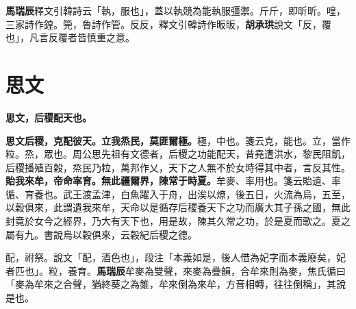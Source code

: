 \begin{quoting}\textbf{馬瑞辰}釋文引韓詩云「執，服也」，蓋以執競為能執服彊禦。斤斤，即昕昕。喤，三家詩作鍠。筦，魯詩作管。反反，釋文引韓詩作昄昄，\textbf{胡承珙}說文「反，覆也」，凡言反覆者皆慎重之意。\end{quoting}

\section{思文}


\textbf{思文，后稷配天也。}

\textbf{思文后稷，克配彼天。立我烝民，莫匪爾極。}{\footnotesize 極，中也。箋云克，能也。立，當作粒。烝，眾也。周公思先祖有文德者，后稷之功能配天，昔堯遭洪水，黎民阻飢，后稷播殖百穀，烝民乃粒，萬邦作乂，天下之人無不於女時得其中者，言反其性。}\textbf{貽我來牟，帝命率育。無此疆爾界，陳常于時夏。}{\footnotesize 牟麥、率用也。箋云貽遺、率循、育養也。武王渡孟津，白魚躍入于舟，出涘以燎，後五日，火流為烏，五至，以穀俱來，此謂遺我來牟，天命以是循存后稷養天下之功而廣大其子孫之國，無此封竟於女今之經界，乃大有天下也，用是故，陳其久常之功，於是夏而歌之。夏之屬有九。書說烏以穀俱來，云穀紀后稷之德。}

\begin{quoting}配，祔祭。說文「配，酒色也」，段注「本義如是，後人借為妃字而本義廢矣，妃者匹也」。粒，養育。\textbf{馬瑞辰}牟麥為雙聲，來麥為疊韻，合牟來則為麥，焦氏循曰「麥為牟來之合聲，猶終葵之為錐，牟來倒為來牟，方音相轉，往往倒稱」，其說是也。\end{quoting}

